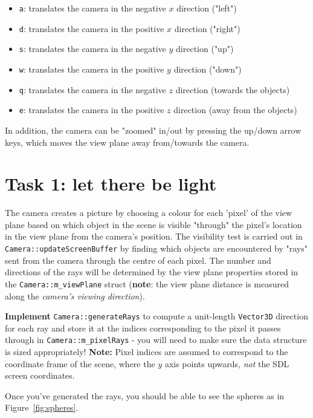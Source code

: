 \documentclass{../../../fal_assignment}
\begin{document}
\begin{itemize}
	\item \lstinline{a}: translates the camera in the negative $x$ direction ("left")
	\item \lstinline{d}: translates the camera in the positive $x$ direction ("right")
	\item \lstinline{s}: translates the camera in the negative $y$ direction ("up")
	\item \lstinline{w}: translates the camera in the positive $y$ direction ("down")
	\item \lstinline{q}:  translates the camera in the negative $z$ direction (towards the objects)
	\item \lstinline{e}:  translates the camera in the positive $z$ direction (away from the objects)
\end{itemize}

In addition, the camera can be "zoomed" in/out by pressing the up/down arrow keys, which moves the view plane away from/towards the camera.

\section*{Task 1: let there be light}

The camera creates a picture by choosing a colour for each 'pixel' of the view plane based on which object in the scene is visible "through" the pixel's location in the view plane from the camera's position. The visibility test is carried out in \lstinline{Camera::updateScreenBuffer} by finding which objects are encountered by "rays" sent from the camera through the centre of each pixel. The number and directions of the rays will be determined by the view plane properties stored in the \lstinline{Camera::m_viewPlane} struct (\textbf{note}: the view plane distance is measured along the \textit{camera's viewing direction}).

\textbf{Implement} \lstinline{Camera::generateRays} to compute a unit-length \lstinline{Vector3D} direction for each ray and store it at the indices corresponding to the pixel it passes through in \lstinline{Camera::m_pixelRays} - you will need to make sure the data structure is sized appropriately!
\textbf{Note:} Pixel indices are assumed to correspond to the coordinate frame of the scene, where the $y$ axis points upwards, \textit{not} the SDL screen coordinates.

Once you've generated the rays, you should be able to see the spheres as in Figure~\ref{fig:spheres}.
\end{document}
